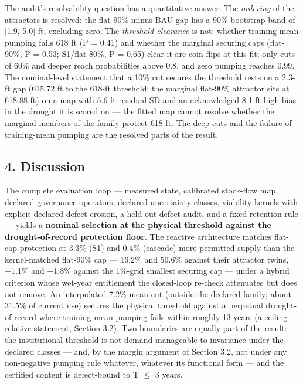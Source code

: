 \documentclass[11pt]{article}
\begin{document}
The audit's resolvability question has a quantitative answer. The
\emph{ordering} of the attractors is resolved: the flat-90\%-minus-BAU
gap has a 90\% bootstrap band of {[}1.9, 5.0{]} ft, excluding zero. The
\emph{threshold clearance} is not: whether training-mean pumping fails
618 ft (P = 0.41) and whether the marginal securing caps (flat-90\%, P =
0.53; S1/flat-80\%, P = 0.65) clear it are coin flips at this fit; only
cuts of 60\% and deeper reach probabilities above 0.8, and zero pumping
reaches 0.99. The nominal-level statement that a 10\% cut secures the
threshold rests on a 2.3-ft gap (615.72 ft to the 618-ft threshold; the
marginal flat-90\% attractor sits at 618.88 ft) on a map with 5.6-ft
residual SD and an acknowledged 8.1-ft high bias in the drought it is
scored on --- the fitted map cannot resolve whether the marginal members
of the family protect 618 ft. The deep cuts and the failure of
training-mean pumping are the resolved parts of the result.

\subsection{4. Discussion}\label{edw-discussion}

The complete evaluation loop --- measured state, calibrated stock-flow
map, declared governance operators, declared uncertainty classes,
viability kernels with explicit declared-defect erosion, a held-out
defect audit, and a fixed retention rule --- yields a \textbf{nominal
selection at the physical threshold against the drought-of-record protection floor}. The
reactive architecture matches flat-cap protection at 3.3\% (S1) and
0.4\% (cascade) more permitted supply than the kernel-matched flat-90\%
cap --- 16.2\% and 50.6\% against their attractor twins, +1.1\% and
\ensuremath{-}1.8\% against the 1\%-grid smallest securing cap --- under a hybrid
criterion whose wet-year entitlement the closed-loop re-check attenuates
but does not remove. An interpolated 7.2\% mean cut (outside the
declared family; about 31.5\% of current use) secures the physical
threshold against a perpetual drought-of-record where training-mean
pumping fails within roughly 13 years (a ceiling-relative statement,
Section 3.2). Two boundaries are equally part of the result: the
institutional threshold is not demand-manageable to invariance under the
declared classes --- and, by the margin argument of Section 3.2, not
under any non-negative pumping rule whatever, whatever its functional
form --- and the certified content is defect-bound to T \ensuremath{\leq} 3
years.
\end{document}
